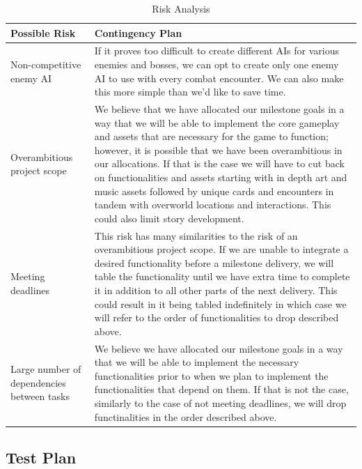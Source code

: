 \documentclass[12pt,titlepage]{article}
\begin{document}
\begin{table}[H]
    \caption{Risk Analysis}
    \label{tab:risks}
    \centering
    \begin{tabularx}{\linewidth}{|l|X|}
        \hline
        \textbf{Possible Risk} & \textbf{Contingency Plan} \\
        \hline
        Non-competitive enemy AI & If it proves too difficult to create
        different AIs for various enemies and bosses, we can opt to create only
        one enemy AI to use with every combat encounter. We can also make this
        more simple than we'd like to save time. \\
        \hline
        Overambitious project scope & We believe that we have allocated our
        milestone goals in a way that we will be able to implement the core
        gameplay and assets that are necessary for the game to function;
        however, it is possible that we have been overambitious in our
        allocations. If that is the case we will have to cut back on
        functionalities and assets starting with in depth art and music assets
        followed by unique cards and encounters in tandem with overworld
        locations and interactions. This could also limit story development.  \\
        \hline
        Meeting deadlines & This risk has many similarities to the risk of an
        overambitious project scope. If we are unable to integrate a desired
        functionality before a milestone delivery, we will table the
        functionality until we have extra time to complete it in addition to all
        other parts of the next delivery. This could result in it being tabled
        indefinitely in which case we will refer to the order of functionalities
        to drop described above. \\
        \hline
        Large number of dependencies between tasks & We believe we have
        allocated our milestone goals in a way that we will be able to implement
        the necessary functionalities prior to when we plan to implement the
        functionalities that depend on them. If that is not the case, similarly
        to the case of not meeting deadlines, we will drop functinalities in the
        order described above. \\
        \hline
    \end{tabularx}
\end{table}

\subsection{Test Plan}
\end{document}
